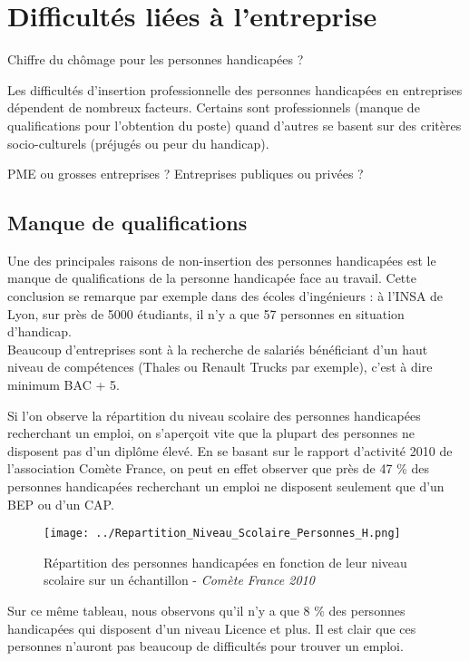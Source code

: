 \chapter{Difficultés liées à l'entreprise}

Chiffre du chômage pour les personnes handicapées ?

Les difficultés d'insertion professionnelle des personnes handicapées en entreprises dépendent de nombreux facteurs. Certains sont professionnels (manque de qualifications pour l'obtention du poste) quand d'autres se basent sur des critères socio-culturels (préjugés ou peur du handicap).

PME ou grosses entreprises ? Entreprises publiques ou privées ?

\section{Manque de qualifications}

Une des principales raisons de non-insertion des personnes handicapées est le manque de qualifications de la personne handicapée face au travail. Cette conclusion se remarque par exemple dans des écoles d'ingénieurs : à l'INSA de Lyon, sur près de 5000 étudiants, il n'y a que 57 personnes en situation d'handicap.\\

Beaucoup d'entreprises sont à la recherche de salariés bénéficiant d'un haut niveau de compétences (Thales ou Renault Trucks par exemple), c'est à dire minimum BAC + 5.

Si l'on observe la répartition du niveau scolaire des personnes handicapées recherchant un emploi, on s'aperçoit vite que la plupart des personnes ne disposent pas d'un diplôme élevé.
En se basant sur le rapport d'activité 2010 de l'association Comète France, on peut en effet observer que près de 47 \% des personnes handicapées recherchant un emploi ne disposent seulement que d'un BEP ou d'un CAP.\\

\begin{figure}[h!]
\centering
\texttt{[image: ../Repartition\_Niveau\_Scolaire\_Personnes\_H.png]}
\caption{Répartition des personnes handicapées en fonction de leur niveau scolaire sur un échantillon - \textit{Comète France 2010}}
\end{figure}

Sur ce même tableau, nous observons qu'il n'y a que 8 \% des personnes handicapées qui disposent d'un niveau Licence et plus. Il est clair que ces personnes n'auront pas beaucoup de difficultés pour trouver un emploi. \\


